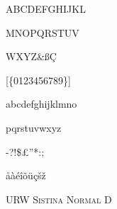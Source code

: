 \documentclass{article}
\begin{document}
\thispagestyle{empty}

\fontsize{48}{56}\selectfont

\begin{centering}

ABCDEFGHIJKL

MNOPQRSTUV

WXYZ\&{\ss}\c{C}

[\{{\guillemotleft}0123456789{\guillemotright}\}]

abcdefghijklmno

pqrstuvwxyz

-?{\textquestiondown}!\${\pounds}''*:;{\texttrademark}{\textdagger}{\textdaggerdbl}

\textcolor{red}{\textparagraph}

\r{a}\`{a}\'{e}\^{i}\~{o}\"{u}\c{c}\v{s}\v{z}

{\fontsize{12}{12}\selectfont \textsc{URW Sistina Normal D}}

\end{centering}
\end{document}
